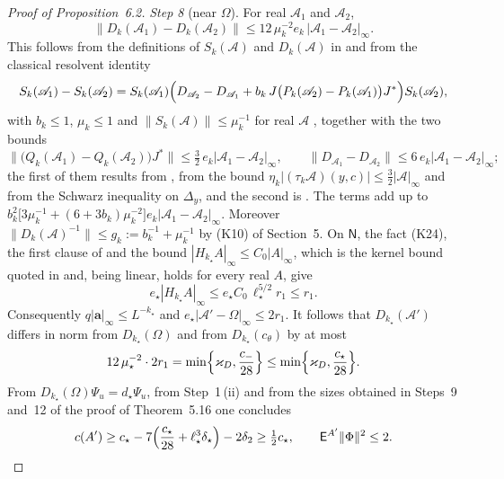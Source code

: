 \documentclass[11pt]{amsart}
\theoremstyle{definition}
\begin{document}
\begin{proof}[Proof of Proposition~6.2]
\emph{Step 8} (near $\Omega$).
For real $\mathscr A_1$ and $\mathscr A_2$,
\begin{equation*}
\|D_k(\mathscr A_1)-D_k(\mathscr A_2)\|\le12\,\mu_k^{-2}e_k\,|\mathscr A_1-\mathscr A_2|_\infty .
\end{equation*}
This follows from the definitions of $S_k(\mathscr A)$ and $D_k(\mathscr A)$ in \cite[Section~I.3.5]{QEDIII} and from the classical resolvent identity
\begin{equation*}
S_k(\mathscr A_1)-S_k(\mathscr A_2)=S_k(\mathscr A_1)\Bigl(D_{\mathscr A_2}-D_{\mathscr A_1}+b_k\,J\bigl(P_k(\mathscr A_2)-P_k(\mathscr A_1)\bigr)J^*\Bigr)S_k(\mathscr A_2),
\end{equation*}
with $b_k\le1$, $\mu_k\le1$ and $\|S_k(\mathscr A)\|\le\mu_k^{-1}$ for real $\mathscr A$ \cite[(I.O2), (I.Q2)]{QEDIII}, together with the two bounds
\begin{equation*}
\bigl\|\bigl(Q_k(\mathscr A_1)-Q_k(\mathscr A_2)\bigr)J^*\bigr\|\le\tfrac32\,e_k|\mathscr A_1-\mathscr A_2|_\infty,\qquad\|D_{\mathscr A_1}-D_{\mathscr A_2}\|\le6\,e_k|\mathscr A_1-\mathscr A_2|_\infty;
\end{equation*}
the first of them results from \cite[(I.3.3)]{QEDIII}, from the bound $\eta_k|(\tau_k\mathscr A)(y,c)|\le\frac32|\mathscr A|_\infty$ \cite[Section~I.9.2, Lemma (Bound for the axial functional)]{QEDIII} and from the Schwarz inequality on $\Delta_y$, and the second is \cite[(I.O6)]{QEDIII}.
The terms add up to $b_k^2\bigl[3\mu_k^{-1}+(6+3b_k)\mu_k^{-2}\bigr]e_k|\mathscr A_1-\mathscr A_2|_\infty$.
Moreover $\|D_k(\mathscr A)^{-1}\|\le g_k:=b_k^{-1}+\mu_k^{-1}$ by (K10) of Section~5.
On $\mathsf N$, the fact (K24), the first clause of \cite[(T2)]{QEDIII} and the bound $|H_{k_\star}A|_\infty\le C_0|A|_\infty$, which is the kernel bound quoted in \cite[(32.8)]{QEDIII} and, being linear, holds for every real $A$, give
\begin{equation*}
e_\star|H_{k_\star}A|_\infty\le e_\star C_0\,\ell_\star^{5/2}r_1\le r_1 .
\end{equation*}
Consequently $q|\mathbf a|_\infty\le L^{-k_\star}$ and $e_\star|\mathscr A'-\Omega|_\infty\le2r_1$.
It follows that $D_{k_\star}(\mathscr A')$ differs in norm from $D_{k_\star}(\Omega)$ and from $D_{k_\star}(c_\theta)$ by at most
\begin{equation*}
12\,\mu_\star^{-2}\cdot2r_1=\min\Bigl\{\varkappa_D,\frac{c_-}{28}\Bigr\}\le\min\Bigl\{\varkappa_D,\frac{c_\star}{28}\Bigr\}.
\end{equation*}
From $D_{k_\star}(\Omega)\Psi_u=d_\star\Psi_u$, from Step~1\,(ii) and from the sizes obtained in Steps~9 and~12 of the proof of Theorem~5.16 one concludes
\begin{equation*}
c(A')\ge c_\star-7\Bigl(\frac{c_\star}{28}+\ell_\star^3\delta_\star\Bigr)-2\delta_2\ge\tfrac12c_\star,\qquad\mathsf E^{A'}\|\Phi\|^2\le2 .
\end{equation*}


\end{proof}
\end{document}
